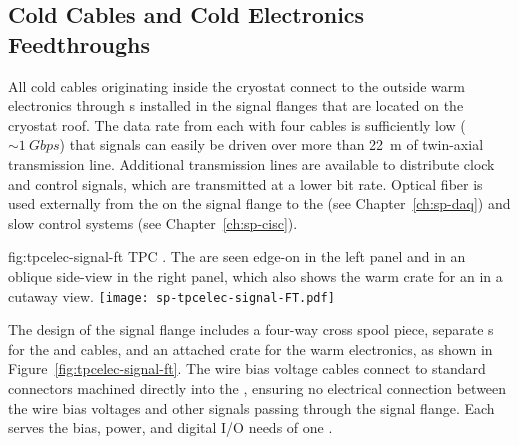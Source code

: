 \subsection{Cold Cables and Cold Electronics Feedthroughs}
\label{sec:fdsp-tpcelec-design-ft}

All cold cables originating inside the cryostat connect to the outside 
warm electronics through  \fdth{}s installed in the signal 
flanges that are located on the cryostat roof. The data rate from each
 with four cables is sufficiently low ($\sim\SI{1}{Gbps}$)
that  signals can easily be driven over more than \SI{22}{m}
of twin-axial transmission line. Additional transmission lines
are available to distribute  clock and control signals,
which are transmitted at a lower bit rate.
Optical fiber is used externally from the  on the signal 
flange to the  (see Chapter~\ref{ch:sp-daq}) and slow 
control systems (see Chapter~\ref{ch:sp-cisc}).

\begin{dunefigure}
{fig:tpcelec-signal-ft}
{TPC  \fdth. The  are seen edge-on in the left 
panel and in an oblique side-view in the right panel, which also shows 
the warm crate for an  in a cutaway view.}
\texttt{[image: sp-tpcelec-signal-FT.pdf]}
\end{dunefigure}

The design of the signal flange includes a four-way cross spool 
piece, separate  \fdth{}s for the  and 
 cables, and an attached crate for the  
warm electronics, as shown in Figure~\ref{fig:tpcelec-signal-ft}.
The wire bias voltage cables connect to standard  
connectors machined directly into the  \fdth{}, ensuring 
no electrical connection between the wire bias voltages and other 
signals passing through the signal flange. Each  \fdth 
serves the bias, power, and digital I/O needs of one .  

